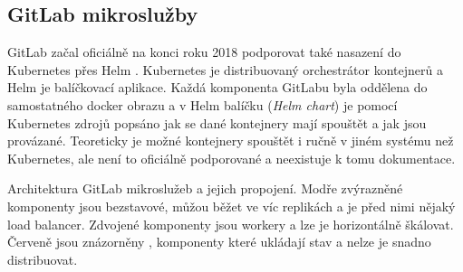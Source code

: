     \subsection{GitLab mikroslužby}
        GitLab začal oficiálně na konci roku 2018 podporovat také nasazení do Kubernetes přes Helm \cite{gitlab-helm-chart}. Kubernetes je distribuovaný orchestrátor kontejnerů a Helm je balíčkovací aplikace. Každá komponenta GitLabu byla oddělena do samostatného docker obrazu a v Helm balíčku (\textit{Helm chart}) je pomocí Kubernetes zdrojů popsáno jak se dané kontejnery mají spouštět a jak jsou provázané. Teoreticky je možné kontejnery spouštět i ručně v jiném systému než Kubernetes, ale není to oficiálně podporované a neexistuje k tomu dokumentace.

        \begin{iffigure}
            \centering
            \caption{Architektura GitLab mikroslužeb a jejich propojení. Modře zvýrazněné komponenty jsou bezstavové, můžou běžet ve víc replikách a je před nimi nějaký load balancer. Zdvojené komponenty jsou workery a lze je horizontálně škálovat. Červeně jsou znázorněny , komponenty které ukládají stav a nelze je snadno distribuovat.}
            \label{pic:gitlab-architecture}
        \end{iffigure}

